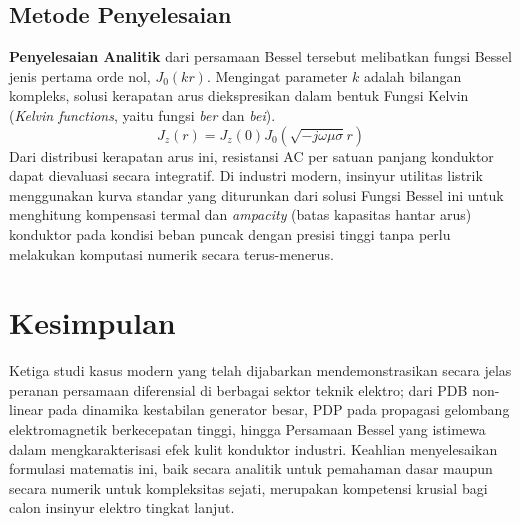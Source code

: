 \documentclass[12pt,a4paper]{article}
\theoremstyle{definition}
\begin{document}
\subsection{Metode Penyelesaian}
\textbf{Penyelesaian Analitik} dari persamaan Bessel tersebut melibatkan fungsi Bessel jenis pertama orde nol, $J_0(kr)$. Mengingat parameter $k$ adalah bilangan kompleks, solusi kerapatan arus diekspresikan dalam bentuk Fungsi Kelvin (\textit{Kelvin functions}, yaitu fungsi \textit{ber} dan \textit{bei}).
\begin{equation}
    J_z(r) = J_z(0) J_0(\sqrt{-j\omega\mu\sigma} r)
\end{equation}
Dari distribusi kerapatan arus ini, resistansi AC per satuan panjang konduktor dapat dievaluasi secara integratif. Di industri modern, insinyur utilitas listrik menggunakan kurva standar yang diturunkan dari solusi Fungsi Bessel ini untuk menghitung kompensasi termal dan \textit{ampacity} (batas kapasitas hantar arus) konduktor pada kondisi beban puncak dengan presisi tinggi tanpa perlu melakukan komputasi numerik secara terus-menerus.

\section{Kesimpulan}
Ketiga studi kasus modern yang telah dijabarkan mendemonstrasikan secara jelas peranan persamaan diferensial di berbagai sektor teknik elektro; dari PDB non-linear pada dinamika kestabilan generator besar, PDP pada propagasi gelombang elektromagnetik berkecepatan tinggi, hingga Persamaan Bessel yang istimewa dalam mengkarakterisasi efek kulit konduktor industri. Keahlian menyelesaikan formulasi matematis ini, baik secara analitik untuk pemahaman dasar maupun secara numerik untuk kompleksitas sejati, merupakan kompetensi krusial bagi calon insinyur elektro tingkat lanjut.
\end{document}
